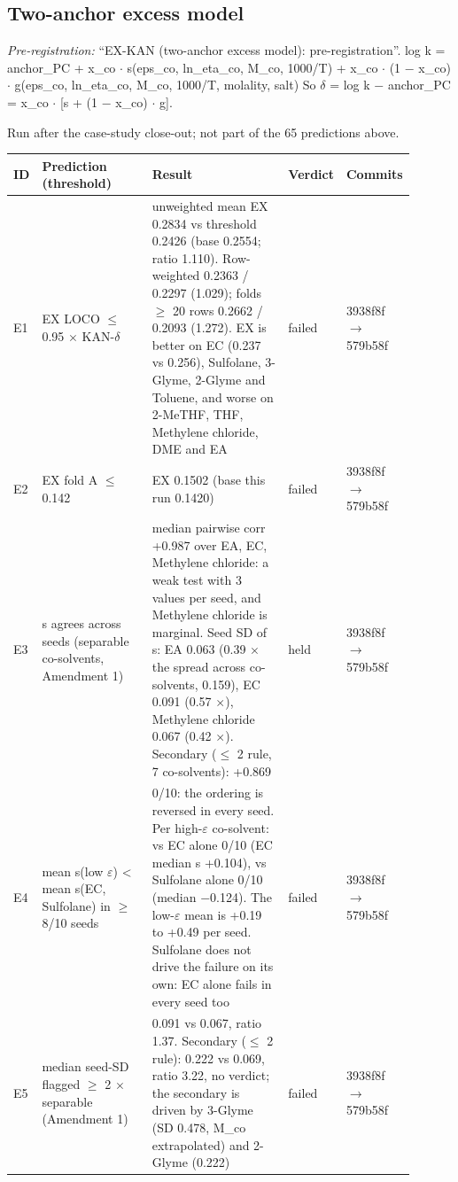 \subsection{Two-anchor excess model}
\noindent\textit{Pre-registration:} ``EX-KAN (two-anchor excess model): pre-registration''. log k = anchor\_PC + x\_co $\cdot$ s(eps\_co, ln\_eta\_co, M\_co, 1000/T) + x\_co $\cdot$ (1 $-$ x\_co) $\cdot$ g(eps\_co, ln\_eta\_co, M\_co, 1000/T, molality, salt) So $\delta$ = log k $-$ anchor\_PC = x\_co $\cdot$ [s + (1 $-$ x\_co) $\cdot$ g].

Run after the case-study close-out; not part of the 65 predictions above.

{\footnotesize\setlength{\tabcolsep}{3pt}
\begin{longtable}{R{0.07\linewidth} R{0.28\linewidth} R{0.35\linewidth} R{0.09\linewidth} R{0.11\linewidth}}
\toprule
ID & Prediction (threshold) & Result & Verdict & Commits \\
\midrule
\endhead
E1 & EX LOCO $\leq$ 0.95 $\times$ KAN-$\delta$ & unweighted mean EX 0.2834 vs threshold 0.2426 (base 0.2554; ratio 1.110). Row-weighted 0.2363 / 0.2297 (1.029); folds $\geq$ 20 rows 0.2662 / 0.2093 (1.272). EX is better on EC (0.237 vs 0.256), Sulfolane, 3-Glyme, 2-Glyme and Toluene, and worse on 2-MeTHF, THF, Methylene chloride, DME and EA & failed & 3938f8f$\to$\allowbreak 579b58f \\
E2 & EX fold A $\leq$ 0.142 & EX 0.1502 (base this run 0.1420) & failed & 3938f8f$\to$\allowbreak 579b58f \\
E3 & s agrees across seeds (separable co-solvents, Amendment 1) & median pairwise corr +0.987 over EA, EC, Methylene chloride: a weak test with 3 values per seed, and Methylene chloride is marginal. Seed SD of s: EA 0.063 (0.39 $\times$ the spread across co-solvents, 0.159), EC 0.091 (0.57 $\times$), Methylene chloride 0.067 (0.42 $\times$). Secondary ($\leq$ 2 rule, 7 co-solvents): +0.869 & held & 3938f8f$\to$\allowbreak 579b58f \\
E4 & mean s(low $\varepsilon$) < mean s(EC, Sulfolane) in $\geq$ 8/10 seeds & 0/10: the ordering is reversed in every seed. Per high-$\varepsilon$ co-solvent: vs EC alone 0/10 (EC median s +0.104), vs Sulfolane alone 0/10 (median $-$0.124). The low-$\varepsilon$ mean is +0.19 to +0.49 per seed. Sulfolane does not drive the failure on its own: EC alone fails in every seed too & failed & 3938f8f$\to$\allowbreak 579b58f \\
E5 & median seed-SD flagged $\geq$ 2 $\times$ separable (Amendment 1) & 0.091 vs 0.067, ratio 1.37. Secondary ($\leq$ 2 rule): 0.222 vs 0.069, ratio 3.22, no verdict; the secondary is driven by 3-Glyme (SD 0.478, M\_co extrapolated) and 2-Glyme (0.222) & failed & 3938f8f$\to$\allowbreak 579b58f \\
\bottomrule
\end{longtable}}
